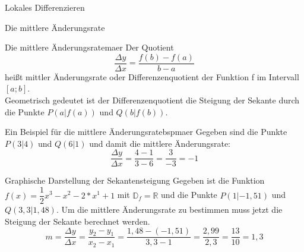 \begin{section}{Lokales Differenzieren}
\begin{subsection}{Die mittlere Änderungsrate}
\begin{defi}{Die mittlere Änderungsrate}{maer}
Der Quotient $$\dfrac{\Delta y}{\Delta x} = \dfrac{f(b) - f(a)}{b - a}$$ heißt mittler Änderungsrate oder Differenzenquotient der Funktion f im Intervall $\left[a;b\right]$.\\
Geometrisch gedeutet ist der Differenzenquotient  die Steigung der Sekante durch die Punkte $P(a|f(a))$ und $Q(b|f(b))$.
\end{defi}
\begin{bsp}{Ein Beispiel für die mittlere Änderungsrate}{bspmaer}
Gegeben sind die Punkte $P(3|4)$ und $Q(6|1)$ und damit die mittlere Änderungsrate: $$ \dfrac{\Delta y}{\Delta x} = \dfrac{4-1}{3-6} = \dfrac{3}{-3} = -1$$
\end{bsp}
\begin{bsp}{Graphische Darstellung der Sekantensteigung}{}
Gegeben ist die Funktion $f(x) =\dfrac{1}{2}x^3-x^2-2*x^1 +1$ mit $\mathds{D}_f =\mathds{R}$ und die Punkte $P(1|-1,51)$ und $Q(3,3|1,48)$. Um die mittlere Änderungsrate zu bestimmen muss jetzt die Steigung der Sekante berechnet werden.
$$m=\dfrac{\Delta y}{\Delta x} = \dfrac{y_2 -y_1}{x_2 -x_1} = \dfrac{1,48 -(-1,51)}{3,3 -1} = \dfrac{2,99}{2,3} = \dfrac{13}{10} = 1,3 $$
\begin{center}
\end{center}
\end{bsp}
\end{subsection}

\end{section}
